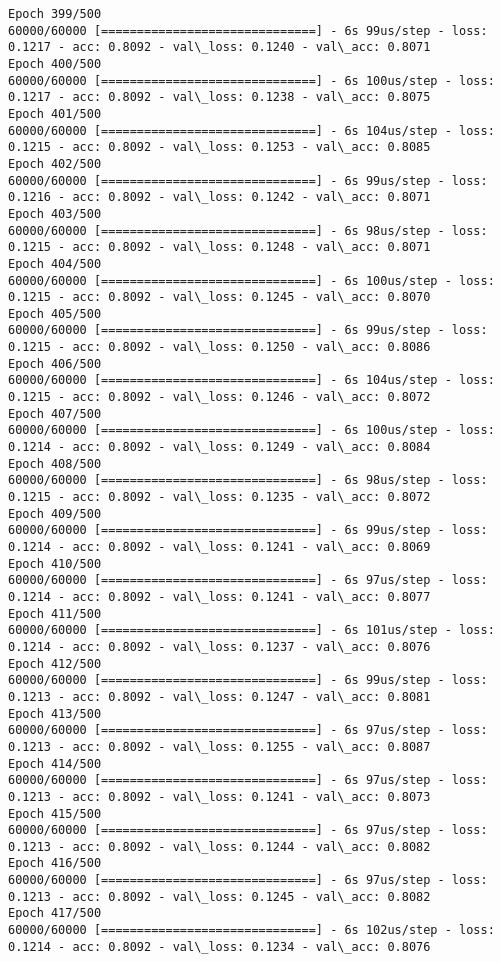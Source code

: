\documentclass[11pt]{article}
\begin{document}
\begin{Verbatim}[commandchars=\\\{\}]
Epoch 399/500
60000/60000 [==============================] - 6s 99us/step - loss: 0.1217 - acc: 0.8092 - val\_loss: 0.1240 - val\_acc: 0.8071
Epoch 400/500
60000/60000 [==============================] - 6s 100us/step - loss: 0.1217 - acc: 0.8092 - val\_loss: 0.1238 - val\_acc: 0.8075
Epoch 401/500
60000/60000 [==============================] - 6s 104us/step - loss: 0.1215 - acc: 0.8092 - val\_loss: 0.1253 - val\_acc: 0.8085
Epoch 402/500
60000/60000 [==============================] - 6s 99us/step - loss: 0.1216 - acc: 0.8092 - val\_loss: 0.1242 - val\_acc: 0.8071
Epoch 403/500
60000/60000 [==============================] - 6s 98us/step - loss: 0.1215 - acc: 0.8092 - val\_loss: 0.1248 - val\_acc: 0.8071
Epoch 404/500
60000/60000 [==============================] - 6s 100us/step - loss: 0.1215 - acc: 0.8092 - val\_loss: 0.1245 - val\_acc: 0.8070
Epoch 405/500
60000/60000 [==============================] - 6s 99us/step - loss: 0.1215 - acc: 0.8092 - val\_loss: 0.1250 - val\_acc: 0.8086
Epoch 406/500
60000/60000 [==============================] - 6s 104us/step - loss: 0.1215 - acc: 0.8092 - val\_loss: 0.1246 - val\_acc: 0.8072
Epoch 407/500
60000/60000 [==============================] - 6s 100us/step - loss: 0.1214 - acc: 0.8092 - val\_loss: 0.1249 - val\_acc: 0.8084
Epoch 408/500
60000/60000 [==============================] - 6s 98us/step - loss: 0.1215 - acc: 0.8092 - val\_loss: 0.1235 - val\_acc: 0.8072
Epoch 409/500
60000/60000 [==============================] - 6s 99us/step - loss: 0.1214 - acc: 0.8092 - val\_loss: 0.1241 - val\_acc: 0.8069
Epoch 410/500
60000/60000 [==============================] - 6s 97us/step - loss: 0.1214 - acc: 0.8092 - val\_loss: 0.1241 - val\_acc: 0.8077
Epoch 411/500
60000/60000 [==============================] - 6s 101us/step - loss: 0.1214 - acc: 0.8092 - val\_loss: 0.1237 - val\_acc: 0.8076
Epoch 412/500
60000/60000 [==============================] - 6s 99us/step - loss: 0.1213 - acc: 0.8092 - val\_loss: 0.1247 - val\_acc: 0.8081
Epoch 413/500
60000/60000 [==============================] - 6s 97us/step - loss: 0.1213 - acc: 0.8092 - val\_loss: 0.1255 - val\_acc: 0.8087
Epoch 414/500
60000/60000 [==============================] - 6s 97us/step - loss: 0.1213 - acc: 0.8092 - val\_loss: 0.1241 - val\_acc: 0.8073
Epoch 415/500
60000/60000 [==============================] - 6s 97us/step - loss: 0.1213 - acc: 0.8092 - val\_loss: 0.1244 - val\_acc: 0.8082
Epoch 416/500
60000/60000 [==============================] - 6s 97us/step - loss: 0.1213 - acc: 0.8092 - val\_loss: 0.1245 - val\_acc: 0.8082
Epoch 417/500
60000/60000 [==============================] - 6s 102us/step - loss: 0.1214 - acc: 0.8092 - val\_loss: 0.1234 - val\_acc: 0.8076

\end{Verbatim}
\end{document}
